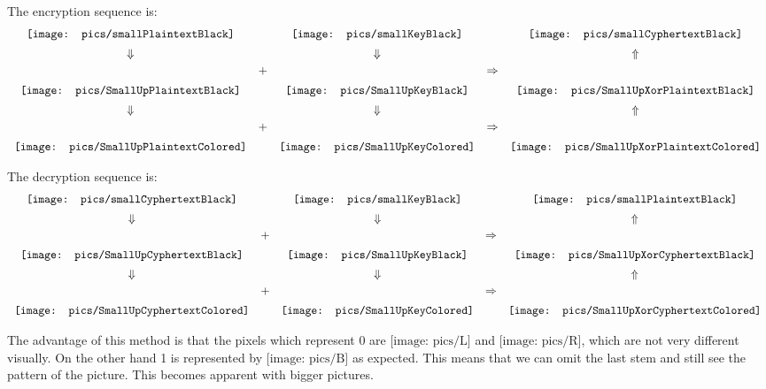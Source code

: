 \documentclass[a4paper,10pt]{article}
\newcommand{\LL}{\mathord{\texttt{[image: pics/L]}}}
\newcommand{\RR}{\mathord{\texttt{[image: pics/R]}}}
\newcommand{\BB}{\mathord{\texttt{[image: pics/B]}}}
\newcommand{\smKeyBlack}{\mathord{\texttt{[image: pics/smallKeyBlack]}}}
\newcommand{\smMesBlack}{\mathord{\texttt{[image: pics/smallPlaintextBlack]}}}
\newcommand{\smCyphBlack}{\mathord{\texttt{[image: pics/smallCyphertextBlack]}}}
\newcommand{\smUpKeyBlack}{\mathord{\texttt{[image: pics/SmallUpKeyBlack]}}}
\newcommand{\smUpMesBlack}{\mathord{\texttt{[image: pics/SmallUpPlaintextBlack]}}}
\newcommand{\smUpCyphBlack}{\mathord{\texttt{[image: pics/SmallUpCyphertextBlack]}}}
\newcommand{\smUpKeyColored}{\mathord{\texttt{[image: pics/SmallUpKeyColored]}}}
\newcommand{\smUpMesColored}{\mathord{\texttt{[image: pics/SmallUpPlaintextColored]}}}
\newcommand{\smUpCyphColored}{\mathord{\texttt{[image: pics/SmallUpCyphertextColored]}}}
\newcommand{\smUpXorCyphColored}{\mathord{\texttt{[image: pics/SmallUpXorCyphertextColored]}}}
\newcommand{\smUpXorMesColored}{\mathord{\texttt{[image: pics/SmallUpXorPlaintextColored]}}}
\newcommand{\smUpXorCyphBlack}{\mathord{\texttt{[image: pics/SmallUpXorCyphertextBlack]}}}
\newcommand{\smUpXorMesBlack}{\mathord{\texttt{[image: pics/SmallUpXorPlaintextBlack]}}}
\begin{document}
The encryption sequence is:
\begin{equation*}
\begin{array}{ccccc}
\smMesBlack &  & \smKeyBlack & & \smCyphBlack \vspace{0.5em}\\
\Downarrow &  & \Downarrow& & \Uparrow \vspace{0.5em}\\
\smUpMesBlack & \raisebox{4ex}{+} & \smUpKeyBlack & \raisebox{4ex}{$\Rightarrow$} & \smUpXorMesBlack \vspace{0.5em} \\
\Downarrow &  & \Downarrow& & \Uparrow \vspace{0.5em}\\
\smUpMesColored & \raisebox{4ex}{+} & \smUpKeyColored & \raisebox{4ex}{$\Rightarrow$} & \smUpXorMesColored
\end{array}
\end{equation*}

The decryption sequence is:
\begin{equation*}
\begin{array}{ccccc}
\smCyphBlack  &  & \smKeyBlack & & \smMesBlack \vspace{0.5em}\\
\Downarrow &  & \Downarrow& & \Uparrow \vspace{0.5em}\\
\smUpCyphBlack & \raisebox{4ex}{+} & \smUpKeyBlack & \raisebox{4ex}{$\Rightarrow$} & \smUpXorCyphBlack \vspace{0.5em} \\
\Downarrow &  & \Downarrow& & \Uparrow \vspace{0.5em}\\
\smUpCyphColored & \raisebox{4ex}{+} & \smUpKeyColored & \raisebox{4ex}{$\Rightarrow$} & \smUpXorCyphColored
\end{array}
\end{equation*}

The advantage of this method is that the pixels which represent 0 are $\LL$ and $\RR$, which are not very different visually. On the other hand 1 is represented by $\BB$ as expected. This means that we can omit the last stem and still see the pattern of the picture. This becomes apparent with bigger pictures.
\end{document}
